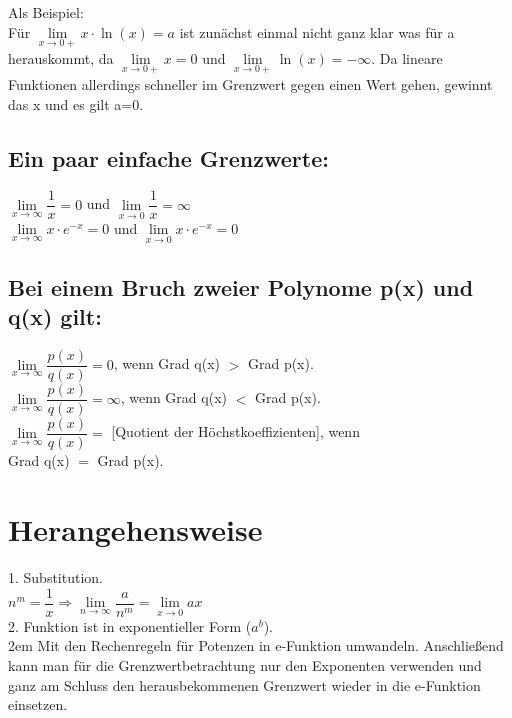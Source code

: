 \documentclass[11pt,final]{scrreprt}
\newcommand{\br} {\medskip\\}
\begin{document}
\par	
\endgroup 

Als Beispiel: \\
Für $ \lim\limits_{x\to 0+} x \cdot \ln(x) = a$ ist zunächst einmal nicht ganz klar was für a herauskommt, da $ \lim\limits_{x\to 0+} x = 0 $ und $ \lim\limits_{x\to 0+} \ln(x) = -\infty$. Da lineare Funktionen allerdings schneller im Grenzwert gegen einen Wert gehen, gewinnt das x und es gilt a=0.\\

\subsection*{Ein paar einfache Grenzwerte:}

$\lim\limits_{x\to\infty} \dfrac{1}{x} = 0$ und $\lim\limits_{x\to 0} \dfrac{1}{x} = \infty$\br
$\lim\limits_{x\to \infty} x\cdot e^{-x} = 0$ und $\lim\limits_{x\to 0} x\cdot e^{-x} = 0$\\

\subsection*{Bei einem Bruch zweier Polynome p(x) und q(x) gilt:}
$\lim\limits_{x\to\infty} \dfrac{p(x)}{q(x)} = 0$, wenn Grad q(x) $>$ Grad p(x).\br
$\lim\limits_{x\to\infty} \dfrac{p(x)}{q(x)} = \infty$, wenn Grad q(x) $<$ Grad p(x).\br
$\lim\limits_{x\to\infty} \dfrac{p(x)}{q(x)} = $ [Quotient der Höchstkoeffizienten], wenn\\
\hspace*{6em}Grad q(x) $=$ Grad p(x).\\

\section{Herangehensweise}
1. Substitution.\br
\hspace*{2em}$ n^m = \dfrac{1}{x} \Rightarrow \lim\limits_{n\to\infty} \dfrac{a}{n^m} = \lim\limits_{x\to 0} ax $\br
2. Funktion ist in exponentieller Form ($a^b$).\\

\begingroup
\leftskip2em 
Mit den Rechenregeln für Potenzen in e-Funktion umwandeln. Anschließend kann man für die Grenzwertbetrachtung nur den Exponenten verwenden und ganz am Schluss den herausbekommenen Grenzwert wieder in die e-Funktion einsetzen.\\
\par	
\endgroup 
\end{document}

